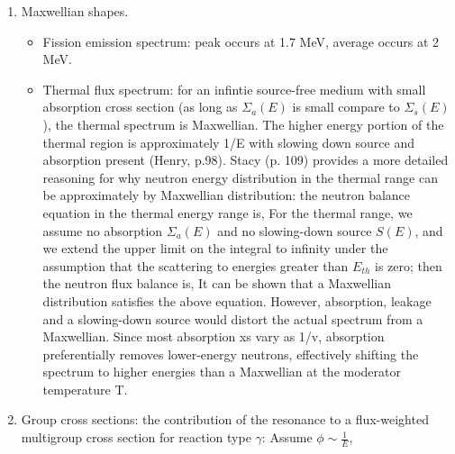 \documentclass{school-22.211-notes}
\begin{document}
\begin{enumerate}
\item Maxwellian shapes.
  \begin{itemize}
  \item Fission emission spectrum: peak occurs at 1.7 MeV, average occurs at 2 MeV.
  \item Thermal flux spectrum: for an infintie source-free medium with small absorption cross section (as long as $\Sigma_a(E)$ is small compare to $\Sigma_s(E)$), the thermal spectrum is Maxwellian. The higher energy portion of the thermal region is approximately 1/E with slowing down source and absorption present (Henry, p.98). Stacy (p. 109) provides a more detailed reasoning for why neutron energy distribution in the thermal range can be approximately by Maxwellian distribution: the neutron balance equation in the thermal energy range is, 
    For the thermal range, we assume no absorption $\Sigma_a(E)$ and no slowing-down source $S(E)$, and we extend the upper limit on the integral to infinity under the assumption that the scattering to energies greater than $E_{th}$ is zero; then the neutron flux balance is,
   It can be shown that a Maxwellian distribution satisfies the above equation. However, absorption, leakage and a slowing-down source would distort the actual spectrum from a Maxwellian. Since most absorption xs vary as 1/v, absorption preferentially removes lower-energy neutrons, effectively shifting the spectrum to higher energies than a Maxwellian at the moderator temperature T. 
  \end{itemize}
  
\item Group cross sections: the contribution of the resonance to a flux-weighted multigroup cross section for reaction type $\gamma$:
  Assume $\phi \sim \frac{1}{E}$,
 
 


\end{enumerate}
\end{document}
